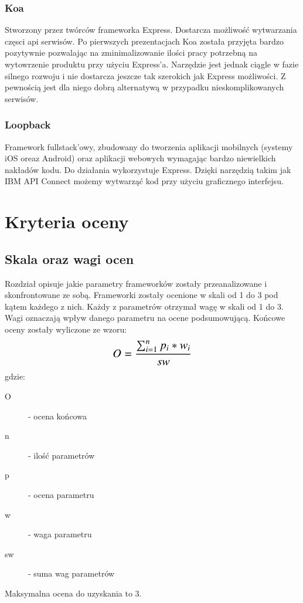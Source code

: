 \documentclass[12pt]{report}
\begin{document}
    \subsection{Koa}
    Stworzony przez twórców frameworka Express.
    Dostarcza możliwość wytwarzania częsci api serwisów.
    Po pierwszych prezentacjach Koa została przyjęta bardzo pozytywnie pozwalając na zminimalizowanie ilości pracy potrzebną na wytowrzenie produktu przy użyciu Express'a.
    Narzędzie jest jednak ciągle w fazie silnego rozwoju i nie dostarcza jeszcze tak szerokich jak Express możliwości.
    Z pewnością jest dla niego dobrą alternatywą w przypadku nieskomplikowanych serwisów.

    \subsection{Loopback}
    Framework fullstack'owy, zbudowany do tworzenia aplikacji mobilnych (systemy iOS oreaz Android) oraz aplikacji webowych wymagając bardzo niewielkich nakładów kodu.
    Do działania wykorzystuje Express.
    Dzięki narzędzią takim jak IBM API Connect możemy wytwarząć kod przy użyciu graficznego interfejsu.

\chapter{Kryteria oceny}

  \section{Skala oraz wagi ocen}
    Rozdział opisuje jakie parametry frameworków zostały przeanalizowane i skonfrontowane ze sobą.
    Frameworki zostały ocenione w skali od 1 do 3 pod kątem każdego z nich.
    Każdy z parametrów otrzymał wagę w skali od 1 do 3.
    Wagi oznaczają wpływ danego parametru na ocene podsumowującą.
    Końcowe oceny zostały wyliczone ze wzoru:
    \newline
    \[\text{\Large$O = \frac{\sum_{i=1}^{n} p_{i} * w_{i}}{sw}$}\]
    \newline
    gdzie:
    \begin{description}
      \item[O] - ocena końcowa
      \item[n] - ilość parametrów
      \item[p] - ocena parametru
      \item[w] - waga parametru
	    \item[sw] - suma wag parametrów
    \end{description}
    Maksymalna ocena do uzyskania to 3.
\end{document}
